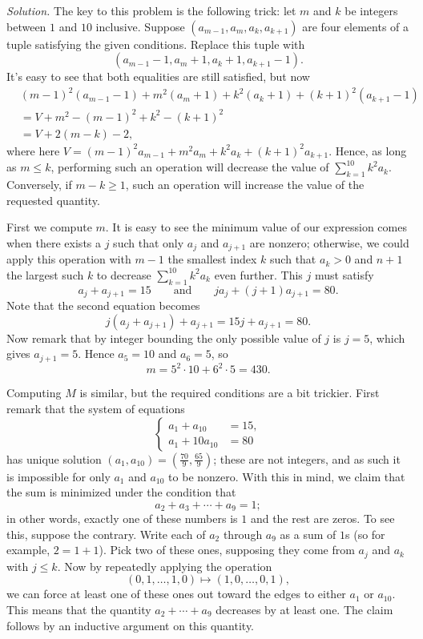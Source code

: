 \documentclass[10pt]{article}
\newcommand{\solution}
{
\vspace{5pt}
\noindent\textit{Solution.}\qquad
}
\begin{document}
\begin{enumerate}
\solution The key to this problem is the following trick: let $m$ and $k$ be integers between $1$ and $10$ inclusive.  Suppose $(a_{m-1},a_m,a_k,a_{k+1})$ are four elements of a tuple satisfying the given conditions.  Replace this tuple with \[(a_{m-1}-1,a_m+1,a_k+1,a_{k+1}-1).\] It's easy to see that both equalities are still satisfied, but now \begin{align*}&(m-1)^2(a_{m-1}-1) + m^2(a_m+1) + k^2(a_k+1) + (k+1)^2(a_{k+1}-1)\\&=V + m^2-(m-1)^2 + k^2 - (k+1)^2\\&=V + 2(m-k) - 2,\end{align*} where here $V = (m-1)^2a_{m-1}+m^2a_m+k^2a_k+(k+1)^2a_{k+1}$.  Hence, as long as $m\leq k$, performing such an operation will decrease the value of $\sum_{k=1}^{10}k^2a_k$.  Conversely, if $m-k\geq 1$, such an operation will increase the value of the requested quantity.

\par First we compute $m$.  It is easy to see the minimum value of our expression comes when there exists a $j$ such that only $a_j$ and $a_{j+1}$ are nonzero; otherwise, we could apply this operation with $m-1$ the smallest index $k$ such that $a_k>0$ and $n+1$ the largest such $k$ to decrease $\sum_{k=1}^{10}k^2a_k$ even further.  This $j$ must satisfy \[a_j+a_{j+1} = 15\qquad\text{and}\qquad ja_j+(j+1)a_{j+1} = 80.\] Note that the second equation becomes \[j(a_j+a_{j+1}) + a_{j+1} = 15j+a_{j+1} = 80.\] Now remark that by integer bounding the only possible value of $j$ is $j=5$, which gives $a_{j+1} = 5$.  Hence $a_5 = 10$ and $a_6 = 5$, so \[m=5^2\cdot 10 + 6^2\cdot 5 = 430.\]

\par Computing $M$ is similar, but the required conditions are a bit trickier.  First remark that the system of equations \[\begin{cases}a_1+a_{10} &= 15,\\a_1 + 10a_{10} &= 80\end{cases}\] has unique solution $(a_1,a_{10}) = (\tfrac{70}9,\tfrac{65}9)$; these are not integers, and as such it is impossible for only $a_1$ and $a_{10}$ to be nonzero.  With this in mind, we claim that the sum is minimized under the condition that \[a_2+a_3+\cdots +a_9 = 1;\] in other words, exactly one of these numbers is $1$ and the rest are zeros.  To see this, suppose the contrary.  Write each of $a_2$ through $a_9$ as a sum of $1$s (so for example, $2=1+1$).  Pick two of these ones, supposing they come from $a_j$ and $a_k$ with $j\leq k$.  Now by repeatedly applying the operation \[(0,1,\ldots, 1,0)\mapsto (1,0,\ldots, 0,1),\] we can force at least one of these ones out toward the edges to either $a_1$ or $a_{10}$.  This means that the quantity $a_2+\cdots +a_9$ decreases by at least one.  The claim follows by an inductive argument on this quantity.


\end{enumerate}
\end{document}
